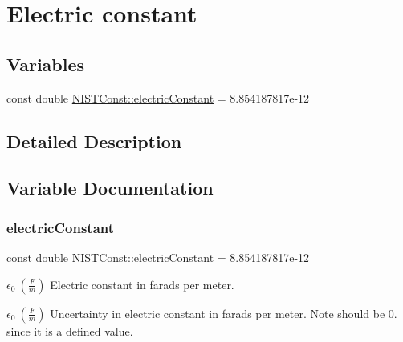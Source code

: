 \hypertarget{group___electric_constant}{}\section{Electric constant}
\label{group___electric_constant}
\subsection*{Variables}
\begin{DoxyCompactItemize}
\item 
const double \hyperlink{group___electric_constant_gae5a425228125285727dd53333725ef76}{N\+I\+S\+T\+Const\+::electric\+Constant} = 8.\+854187817e-\/12
\end{DoxyCompactItemize}


\subsection{Detailed Description}


\subsection{Variable Documentation}
\mbox{\label{group___electric_constant_gae5a425228125285727dd53333725ef76}} 
\subsubsection{\texorpdfstring{electric\+Constant}{electricConstant}}
{\footnotesize\ttfamily const double N\+I\+S\+T\+Const\+::electric\+Constant = 8.\+854187817e-\/12}

$\epsilon_0 \ (\frac{F}{m})$ Electric constant in farads per meter.

$\epsilon_0 \ (\frac{F}{m})$ Uncertainty in electric constant in farads per meter. Note should be 0. since it is a defined value. 